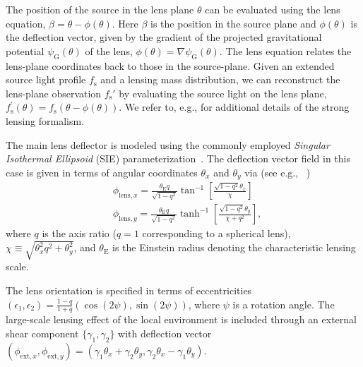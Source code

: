 \documentclass[nohyperref]{article}
\theoremstyle{plain}
\theoremstyle{definition}
\theoremstyle{remark}
\begin{document}
The position of the source in the lens plane  $\theta$ can be evaluated using the lens equation, 
$\beta = \theta - \phi(\theta)$.
Here $\beta$ is the position in the source plane and $\phi(\theta)$ is the deflection vector, given by the gradient of the projected gravitational potential $\psi_\mathrm{G}(\theta)$ of the lens,
$\phi(\theta) = \nabla\psi_\mathrm{G}(\theta)$. The lens equation relates the lens-plane coordinates back to those in the source-plane. Given an extended source light profile $f_\mathrm{s}$ and a lensing mass distribution, we can reconstruct the lens-plane observation $f_\mathrm{s}'$ by evaluating the source light on the lens plane, $f_{\mathrm{s}}^{\prime}({\theta})=f_{\mathrm{s}}({\theta}-{\phi}({\theta}))$. We refer to, e.g., \citet{treu2010strong} for additional details of the strong lensing formalism.

The main lens deflector is modeled using the commonly employed \textit{Singular Isothermal Ellipsoid} (SIE) parameterization~\cite{1994A&A...284..285K,treu2010strong}. The deflection vector field in this case is given in terms of angular coordinates $\theta_x$ and $\theta_y$ via (see e.g., ~\citealt{keeton2001catalog}) 
\begin{equation}
    \begin{aligned}
        &\phi_{\mathrm{lens}, x}=\frac{\theta_{\mathrm{E}} q}{\sqrt{1-q^{2}}} \tan ^{-1}\left[\frac{\sqrt{1-q^{2}} \theta_{x}}{\chi}\right] \\
        &\phi_{\mathrm{lens}, y}=\frac{\theta_{\mathrm{E}} q}{\sqrt{1-q^{2}}} \tanh ^{-1}\left[\frac{\sqrt{1-q^{2}} \theta_{y}}{\chi+q^{2}}\right],
    \end{aligned}
\end{equation}
where $q$ is the axis ratio ($q=1$ corresponding to a spherical lens), $\chi \equiv \sqrt{\theta_{x}^{2} q^{2}+\theta_{y}^{2}}$, and $\theta_\mathrm{E}$ is the Einstein radius denoting the characteristic lensing scale.

The lens orientation is specified in terms of eccentricities $\left(\epsilon_{1}, \epsilon_{2}\right)=\frac{1-q}{1+q}\left(\cos (2 \psi), \sin (2 \psi)\right)$, where $\psi$ is a rotation angle. The large-scale lensing effect of the local environment is included through an external shear component $\{\gamma_1, \gamma_2\}$ with deflection vector $\left(\phi_{\mathrm{ext},x},\phi_{\mathrm{ext},y}\right) = \left(\gamma_1\theta_x + \gamma_2\theta_y, \gamma_2\theta_x - \gamma_1\theta_y\right)$. 
\end{document}

